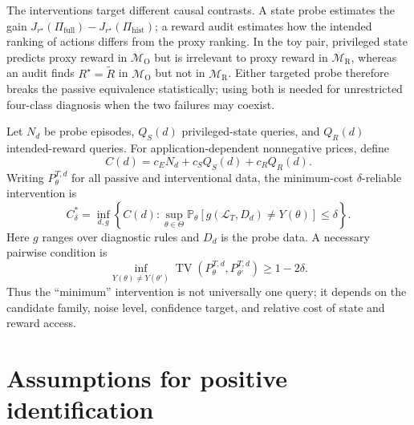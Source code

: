 \documentclass[9pt,twocolumn]{extarticle}
\newcommand{\Pp}{\mathbb{P}}
\newcommand{\TV}{\operatorname{TV}}
\newcommand{\rtrue}{r^{\star}}
\newcommand{\Dpre}{\mathcal{L}_{T}}
\newcommand{\PiFull}{\Pi_{\mathrm{full}}}
\newcommand{\PiHist}{\Pi_{\mathrm{hist}}}
\begin{document}
The interventions target different causal contrasts. A state probe estimates
the gain $J_{\rtrue}(\PiFull)-J_{\rtrue}(\PiHist)$; a reward audit estimates how
the intended ranking of actions differs from the proxy ranking. In the toy
pair, privileged state predicts proxy reward in $\mathcal M_{\mathrm O}$ but is
irrelevant to proxy reward in $\mathcal M_{\mathrm R}$, whereas an audit finds
$R^\star=\widetilde R$ in $\mathcal M_{\mathrm O}$ but not in
$\mathcal M_{\mathrm R}$. Either targeted probe therefore breaks the passive
equivalence statistically; using both is needed for unrestricted four-class
diagnosis when the two failures may coexist.

Let $N_d$ be probe episodes, $Q_S(d)$ privileged-state queries, and $Q_R(d)$
intended-reward queries. For application-dependent nonnegative prices, define
\begin{equation}
C(d)=c_E N_d+c_S Q_S(d)+c_R Q_R(d).
\label{eq:cost}
\end{equation}
Writing $P_\theta^{T,d}$ for all passive and interventional data, the
minimum-cost $\delta$-reliable intervention is
\begin{equation}
C_\delta^*=\inf_{d,g}\left\{C(d):
\sup_{\theta\in\Theta}
\Pp_\theta\!\left[g(\Dpre,D_d)\neq Y(\theta)\right]\leq\delta
\right\}.
\label{eq:min-cost}
\end{equation}
Here $g$ ranges over diagnostic rules and $D_d$ is the probe data. A necessary
pairwise condition is
\begin{equation}
\inf_{Y(\theta)\neq Y(\theta')}
\TV(P_\theta^{T,d},P_{\theta'}^{T,d})\geq 1-2\delta.
\end{equation}
Thus the ``minimum'' intervention is not universally one query; it depends on
the candidate family, noise level, confidence target, and relative cost of
state and reward access.

\section{Assumptions for positive identification}
\end{document}
